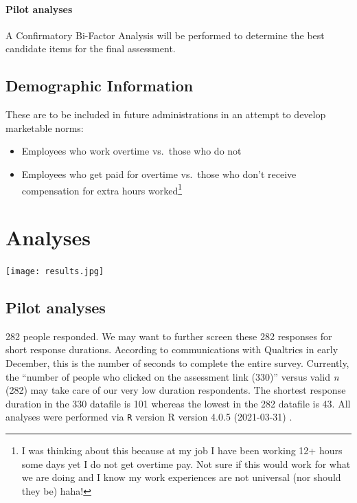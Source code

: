 \documentclass[
]{book}
\providecommand{\tightlist}{%
  \setlength{\itemsep}{0pt}\setlength{\parskip}{0pt}}
\begin{document}
\hypertarget{pilot-analyses}{%
\subsubsection{Pilot analyses}\label{pilot-analyses}}

A Confirmatory Bi-Factor Analysis will be performed to determine the best candidate items for the final assessment.

\hypertarget{demographic-information}{%
\section{Demographic Information}\label{demographic-information}}

These are to be included in future administrations in an attempt to develop marketable norms:

\begin{itemize}
\tightlist
\item
  Employees who work overtime vs.~those who do not
\item
  Employees who get paid for overtime vs.~those who don't receive compensation for extra hours worked\footnote{I was thinking about this because at my job I have been working 12+ hours some days yet I do not get overtime pay. Not sure if this would work for what we are doing and I know my work experiences are not universal (nor should they be) haha!}
\end{itemize}

\hypertarget{analyses}{%
\chapter{Analyses}\label{analyses}}

\texttt{[image: results.jpg]}

\hypertarget{pilot-analyses-1}{%
\section{Pilot analyses}\label{pilot-analyses-1}}

282 people responded. We may want to further screen these 282 responses for short response durations. According to communications with Qualtrics in early December, this is the number of seconds to complete the entire survey. Currently, the ``number of people who clicked on the assessment link (330)'' versus valid \emph{n} (282) may take care of our very low duration respondents. The shortest response duration in the 330 datafile is 101 whereas the lowest in the 282 datafile is 43. All analyses were performed via \texttt{R} version R version 4.0.5 (2021-03-31) \citep{R-base}.
\end{document}
